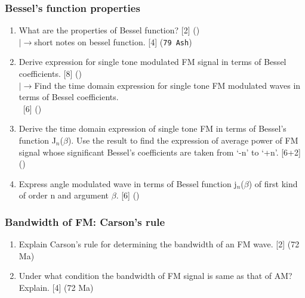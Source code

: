 \documentclass[12pt]{article}
\newcommand{\lb}{\\$\left|\rightarrow\right.$}
\newcommand{\enter}{\\\textcolor{white}{1}}
\begin{document}
    \subsubsection{Bessel's function properties}
      \begin{enumerate}
        \item What are the properties of Bessel function? \hfill [2] ()
          \lb short notes on bessel function. \hfill [4] (\texttt{79 Ash})

        \item Derive expression for single tone modulated FM signal in terms of Bessel coefficients. \hfill [8] ()
        \lb Find the time domain expression for single tone FM modulated waves in terms of Bessel coefficients.
        \enter\hfill [6] ()

        \item Derive the time domain expression of single tone FM in terms of Bessel's function J$_n$($\beta$). Use the result to find the expression of average power of FM signal whose significant Bessel's coefficients are taken from `-n' to `+n'. \hfill [6+2] ()

        \item Express angle modulated wave in terms of Bessel function j$_n$($\beta$) of first kind of order n and argument $\beta$. \hfill [6] ()
      \end{enumerate}

    \subsubsection{Bandwidth of FM: Carson's rule}
      \begin{enumerate}
        \item Explain Carson's rule for determining the bandwidth of an FM wave. \hfill [2] (72 Ma)

        \item Under what condition the bandwidth of FM signal is same as that of AM? Explain. \hfill [4] (72 Ma)
      \end{enumerate}
\end{document}

